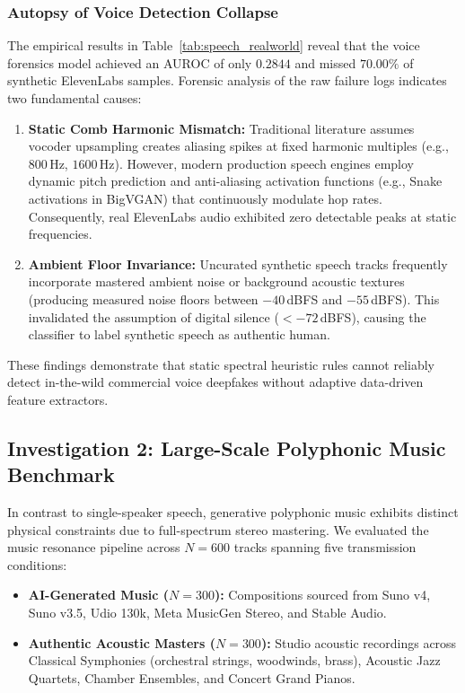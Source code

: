 \documentclass[conference]{IEEEtran}
\theoremstyle{definition}
\begin{document}
\subsubsection{Autopsy of Voice Detection Collapse}
The empirical results in Table~\ref{tab:speech_realworld} reveal that the voice forensics model achieved an AUROC of only $0.2844$ and missed $70.00\%$ of synthetic ElevenLabs samples. Forensic analysis of the raw failure logs indicates two fundamental causes:
\begin{enumerate}
    \item \textbf{Static Comb Harmonic Mismatch:} Traditional literature assumes vocoder upsampling creates aliasing spikes at fixed harmonic multiples (e.g., $800$\,Hz, $1600$\,Hz). However, modern production speech engines employ dynamic pitch prediction and anti-aliasing activation functions (e.g., Snake activations in BigVGAN) that continuously modulate hop rates. Consequently, real ElevenLabs audio exhibited zero detectable peaks at static frequencies.
    \item \textbf{Ambient Floor Invariance:} Uncurated synthetic speech tracks frequently incorporate mastered ambient noise or background acoustic textures (producing measured noise floors between $-40$\,dBFS and $-55$\,dBFS). This invalidated the assumption of digital silence ($<-72$\,dBFS), causing the classifier to label synthetic speech as authentic human.
\end{enumerate}
These findings demonstrate that static spectral heuristic rules cannot reliably detect in-the-wild commercial voice deepfakes without adaptive data-driven feature extractors.

\subsection{Investigation 2: Large-Scale Polyphonic Music Benchmark}

In contrast to single-speaker speech, generative polyphonic music exhibits distinct physical constraints due to full-spectrum stereo mastering. We evaluated the music resonance pipeline across $N=600$ tracks spanning five transmission conditions:
\begin{itemize}
    \item \textbf{AI-Generated Music ($N=300$):} Compositions sourced from Suno v4, Suno v3.5, Udio 130k, Meta MusicGen Stereo, and Stable Audio.
    \item \textbf{Authentic Acoustic Masters ($N=300$):} Studio acoustic recordings across Classical Symphonies (orchestral strings, woodwinds, brass), Acoustic Jazz Quartets, Chamber Ensembles, and Concert Grand Pianos.
\end{itemize}
\end{document}
